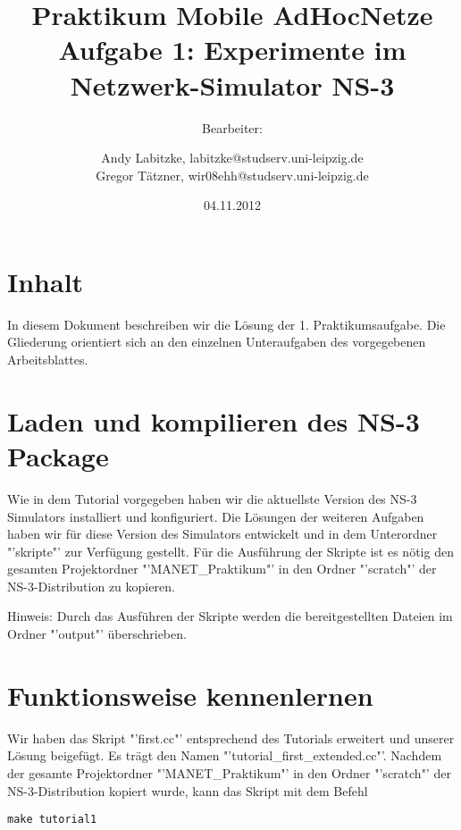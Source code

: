 \documentclass[12pt,a4paper,titlepage]{article}
\begin{document}
\title{Praktikum Mobile AdHocNetze\\
	Aufgabe 1: Experimente im Netzwerk-Simulator NS-3}
\author{
Bearbeiter: \and
	Andy Labitzke, labitzke@studserv.uni-leipzig.de \\ 
	Gregor Tätzner, wir08ehh@studserv.uni-leipzig.de}
\date{04.11.2012}
\maketitle
\setcounter{page}{1}
\appendix

\section*{Inhalt}
In diesem Dokument beschreiben wir die Lösung der 1. Praktikumsaufgabe. Die Gliederung orientiert sich an den einzelnen Unteraufgaben des vorgegebenen Arbeitsblattes.

\setcounter{section}{0}

\section{Laden und kompilieren des NS-3 Package}

Wie in dem Tutorial vorgegeben haben wir die aktuellste Version des NS-3 Simulators installiert und konfiguriert. Die Lösungen der weiteren Aufgaben haben wir für diese Version des Simulators entwickelt und in dem Unterordner "'skripte"' zur Verfügung gestellt. Für die Ausführung der Skripte ist es nötig den gesamten Projektordner "'MANET\_Praktikum"' in den Ordner "'scratch"' der NS-3-Distribution zu kopieren.

\begin{center}
Hinweis: Durch das Ausführen der Skripte werden die bereitgestellten Dateien im Ordner "'output"' überschrieben.
\end{center}

\section{Funktionsweise kennenlernen}

Wir haben das Skript "'first.cc"' entsprechend des Tutorials erweitert und unserer Lösung beigefügt. Es trägt den Namen "'tutorial\_first\_extended.cc"'.
Nachdem der gesamte Projektordner "'MANET\_Praktikum"' in den Ordner "'scratch"' der NS-3-Distribution kopiert wurde, kann das Skript mit dem Befehl

\begin{lstlisting}
make tutorial1
\end{lstlisting}
\end{document}
